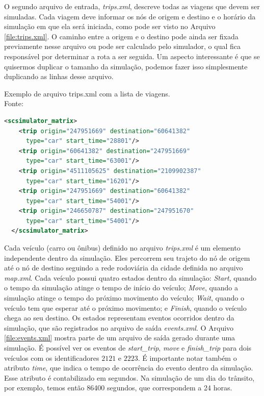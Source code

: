 {  O segundo arquivo de entrada, \emph{trips.xml}, descreve todas as viagens que
devem ser simuladas. Cada viagem deve informar os nós de origem e destino e o
horário da simulação em que ela será iniciada, como pode ser visto no Arquivo
\ref{file:trips.xml}. O caminho entre a origem e o destino pode ainda ser fixada
previamente nesse arquivo ou pode ser calculado pelo simulador, o qual fica
responsável por determinar a rota a ser seguida. Um aspecto interessante é que
se quisermos duplicar o tamanho da simulação, podemos fazer isso simplesmente
duplicando as linhas desse arquivo.

\begin{programruledcaption}{Exemplo de arquivo trips.xml com a lista de viagens. \\Fonte: \citet{mabs2017} \label{file:trips.xml}}
  \begin{lstlisting}[language=XML]
  <scsimulator_matrix>
    <trip origin="247951669" destination="60641382"
      type="car" start_time="28801"/>
    <trip origin="60641382" destination="247951669"
      type="car" start_time="63001"/>
    <trip origin="4511105625" destination="2109902387"
      type="car" start_time="16201"/>
    <trip origin="247951669" destination="60641382"
      type="car" start_time="54001"/>
    <trip origin="246650787" destination="247951670"
      type="car" start_time="54001"/>
  </scsimulator_matrix>
  \end{lstlisting}
\end{programruledcaption}

  Cada veículo (carro ou ônibus) definido no arquivo \emph{trips.xml} é um
elemento independente dentro da simulação. Eles percorrem seu trajeto do nó de
origem até o nó de destino seguindo a rede rodoviária da cidade definida no
arquivo \emph{map.xml}.  Cada veículo possui quatro estados dentro da
simulação: \emph{Start}, quando o tempo da simulação atinge o tempo de início
do veículo; \emph{Move}, quando a simulação atinge o tempo do próximo movimento
do veículo; \emph{Wait}, quando o veículo tem que esperar até o próximo
movimento; e \emph{Finish}, quando o veículo chega ao seu destino. Os estados
representam eventos ocorridos dentro da simulação, que são registrados no
arquivo de saída \emph{events.xml}. O Arquivo \ref{file:events.xml} mostra parte de
um arquivo de saída gerado durante uma simulação. É possível ver os eventos de
\emph{start\_trip}, \emph{move} e \emph{finish\_trip} para dois veículos com os
identificadores $2121$ e $2223$.  É importante notar também o atributo
\emph{time}, que indica o tempo de ocorrência do evento dentro da simulação.
Esse atributo  é contabilizado em segundos. Na simulação de um dia do trânsito,
por exemplo, temos então 86400 segundos, que correspondem a 24 horas.

}
